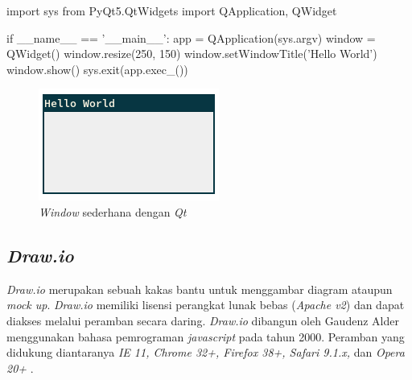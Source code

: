 \par\null\par
\begin{code}
\begin{ignasicblock}[title=hello,minted language=python]
import sys
from PyQt5.QtWidgets import QApplication, QWidget

if __name__ == '__main__':
    app = QApplication(sys.argv)
    window = QWidget()
    window.resize(250, 150)
    window.setWindowTitle('Hello World')
    window.show()
    sys.exit(app.exec_())
\end{ignasicblock}
  \label{code:hello-window}
\end{code}

\begin{figure}[tph]
  \centering
  \includegraphics[width=.4\linewidth]{img/hello-window}
  \caption{\emph{Window} sederhana dengan \emph{Qt}}\label{fig:hello-window}
\end{figure}

\subsection{\emph{Draw.io}}

\emph{Draw.io} merupakan sebuah kakas bantu untuk menggambar
diagram ataupun \emph{mock up}. \emph{Draw.io} memiliki lisensi perangkat lunak bebas (\emph{Apache
  v2}) dan dapat diakses melalui peramban secara daring. \emph{Draw.io} dibangun
oleh Gaudenz Alder menggunakan bahasa pemrograman \emph{javascript} pada tahun 2000. Peramban
yang didukung diantaranya \emph{IE 11, Chrome 32+, Firefox 38+, Safari 9.1.x,}
dan \emph{Opera 20+} \parencite{drawio}.

